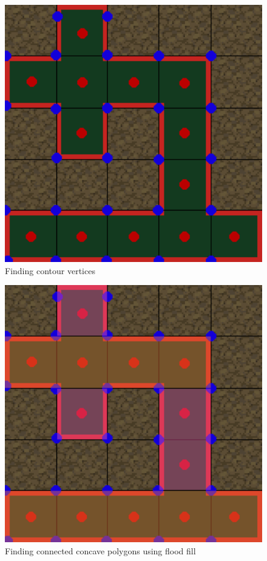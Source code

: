 \begin{figure}[H]
    \centering
    \includegraphics[width=1\textwidth]{figures/generating_levels/wall_with_vertices.png}
    \caption{Finding contour vertices}\label{fig:wall_with_vertices} 
\end{figure}

\begin{figure}[H]
    \centering
    \includegraphics[width=1\textwidth]{figures/generating_levels/wall_with_convex.png}
    \caption{Finding connected concave polygons using flood fill}\label{fig:wall_with_convex} 
\end{figure}
